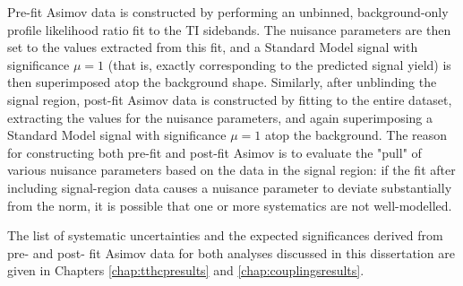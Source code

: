 Pre-fit Asimov data is constructed by performing an unbinned, background-only profile likelihood ratio fit to the TI sidebands. The nuisance parameters are then set to the values extracted from this fit, and a Standard Model signal with significance $\mu = 1$ (that is, exactly corresponding to the predicted signal yield) is then superimposed atop the background shape. Similarly, after unblinding the signal region, post-fit Asimov data is constructed by fitting to the entire dataset, extracting the values for the nuisance parameters, and again superimposing a Standard Model signal with significance $\mu = 1$ atop the background. The reason for constructing both pre-fit and post-fit Asimov is to evaluate the "pull" of various nuisance parameters based on the data in the signal region: if the fit after including signal-region data causes a nuisance parameter to deviate substantially from the norm, it is possible that one or more systematics are not well-modelled.

The list of systematic uncertainties and the expected significances derived from pre- and post- fit Asimov data for both analyses discussed in this dissertation are given in Chapters \ref{chap:tthcpresults} and \ref{chap:couplingsresults}.
